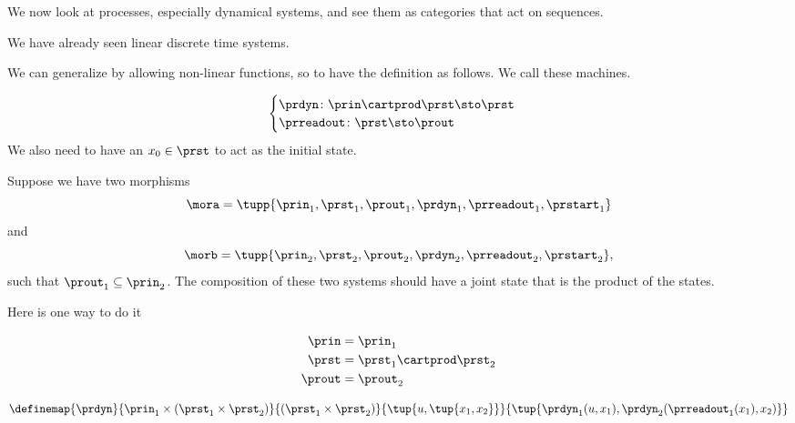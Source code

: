 
\section{}

We now look at processes, especially dynamical systems, and see them as categories that act on sequences.

We have already seen linear discrete time systems.

We can generalize by allowing non-linear functions, so to have
the definition as follows. We call these \Moore machines.

\begin{equation}
    \begin{cases}
    \prdyn \colon \prin \cartprod \prst \sto \prst \\
    \prreadout \colon \prst \sto \prout
    \end{cases}
\end{equation}
We also need to have an $x_0 \in \prst$ to act as the initial state.

Suppose we have two morphisms
\begin{equation}
  \mora = \tupp{\prin_1,\prst_1,\prout_1,\prdyn_1,\prreadout_1,\prstart_1}
\end{equation}
and
\begin{equation}
\morb = \tupp{\prin_2,\prst_2,\prout_2,\prdyn_2,\prreadout_2,\prstart_2},
\end{equation}
such that $\prout_1 \subseteq \prin_2$. The composition of these two systems should have a joint state that is the product of the states.

Here is one way to do it 

\begin{equation}
  \begin{aligned}
  \prin &= \prin_1   \\
  \prst &= \prst_1 \cartprod \prst_2 \\
  \prout &= \prout_2 \\
  \end{aligned}
\end{equation}

\begin{equation}
  \definemap{
    \prdyn
    }{
      \prin_1 \times (\prst_1 \times \prst_2) 
    }{
      (\prst_1 \times \prst_2)
    }{
      \tup{u, \tup{x_1, x_2}}
    }{
    \tup{ \prdyn_1 (u, x_1), \prdyn_2(\prreadout_1(x_1), x_2)}
    }
\end{equation}

